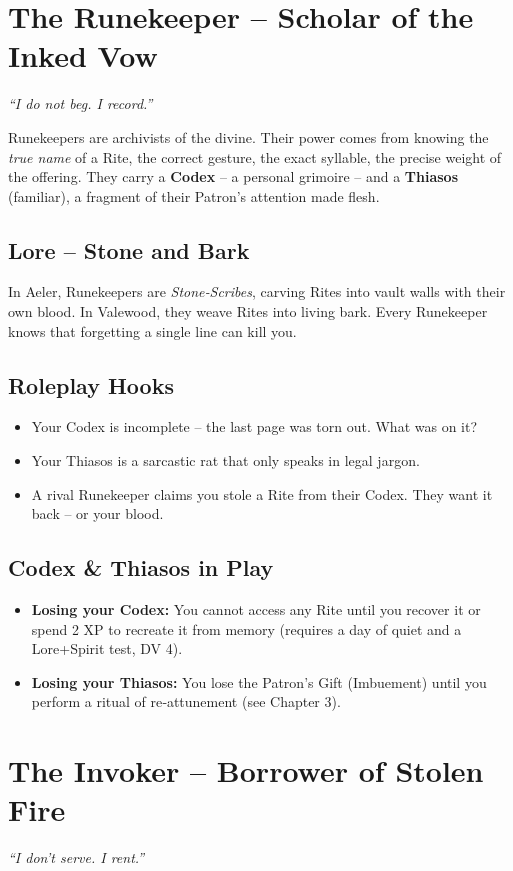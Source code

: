 \documentclass[10pt,a5paper]{book}
\begin{document}
\section{The Runekeeper – Scholar of the Inked Vow}
\textit{“I do not beg. I record.”}

Runekeepers are archivists of the divine. Their power comes from knowing the \textit{true name} of a Rite, the correct gesture, the exact syllable, the precise weight of the offering. They carry a \textbf{Codex} – a personal grimoire – and a \textbf{Thiasos} (familiar), a fragment of their Patron’s attention made flesh.

\subsection{Lore – Stone and Bark}
In Aeler, Runekeepers are \textit{Stone‑Scribes}, carving Rites into vault walls with their own blood. In Valewood, they weave Rites into living bark. Every Runekeeper knows that forgetting a single line can kill you.

\subsection{Roleplay Hooks}
\begin{itemize}
    \item Your Codex is incomplete – the last page was torn out. What was on it?
    \item Your Thiasos is a sarcastic rat that only speaks in legal jargon.
    \item A rival Runekeeper claims you stole a Rite from their Codex. They want it back – or your blood.
\end{itemize}

\subsection{Codex \& Thiasos in Play}
\begin{itemize}
    \item \textbf{Losing your Codex:} You cannot access any Rite until you recover it or spend 2 XP to recreate it from memory (requires a day of quiet and a Lore+Spirit test, DV 4).
    \item \textbf{Losing your Thiasos:} You lose the Patron’s Gift (Imbuement) until you perform a ritual of re‑attunement (see Chapter 3).
\end{itemize}

\section{The Invoker – Borrower of Stolen Fire}
\textit{“I don’t serve. I rent.”}
\end{document}
